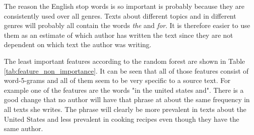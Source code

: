 The reason the English stop words is so important is probably because they are
consistently used over all genres. Texts about different topics and in different
genres will probably all contain the words \textit{the} and \textit{for}. It is
therefore easier to use them as an estimate of which author has written the text
since they are not dependent on which text the author was writing.

The least important features according to the random forest are shown in Table
\ref{tab:feature_non_importance}. It can be seen that all of those features
consist of word-5-grams and all of them seem to be very specific to a source
text. For example one of the features are the words "in the united states and".
There is a good change that no author will have that phrase at about the same
frequency in all texts she writes. The phrase will clearly be more prevalent in
texts about the United States and less prevalent in cooking recipes even though
they have the same author.

